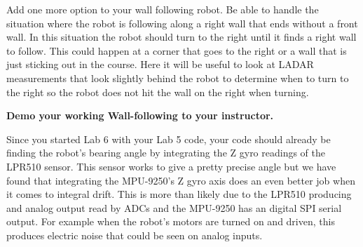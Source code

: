 \documentclass[11pt]{article}
\begin{document}
    Add one more option to your wall following robot. Be able to handle the situation where the robot is following along a right wall that ends without a front wall. In this situation the robot should turn to the right until it finds a right wall to follow. This could happen at a corner that goes to the right or a wall that is just sticking out in the course. Here it will be useful to look at LADAR measurements that look slightly behind the robot to determine when to turn to the right so the robot does not hit the wall on the right when turning.
    \begin{checkoff}
            \textbf{Demo your working Wall-following to your instructor.}
    \end{checkoff}

    Since you started Lab 6 with your Lab 5 code, your code should already be finding the robot’s bearing angle by integrating the Z gyro readings of the LPR510 sensor. This sensor works to give a pretty precise angle but we have found that integrating the MPU-9250’s Z gyro axis does an even better job when it comes to integral drift. This is more than likely due to the LPR510 producing and analog output read by ADCs and the MPU-9250 has an digital SPI serial output. For example when the robot’s motors are turned on and driven, this produces electric noise that could be seen on analog inputs.
\end{document}
